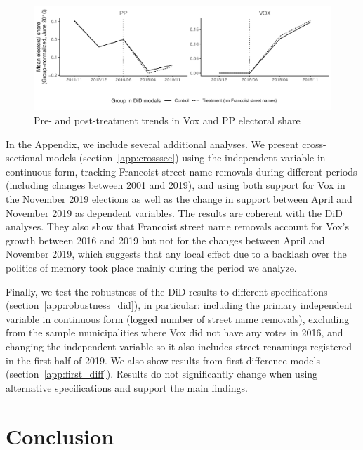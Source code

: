 \documentclass[12pt, titlepage]{article}
\begin{document}
\begin{figure}[htb!]
\centering

  \includegraphics[width = \textwidth]{img/par_trends_norm}

  \caption{Pre- and post-treatment trends in Vox and PP electoral share}\label{fig:par_trends_norm}

\end{figure}

In the Appendix, we include several additional analyses. We present cross-sectional models (section~\ref{app:crosssec}) using the independent variable in continuous form, tracking Francoist street name removals during different periods (including changes between 2001 and 2019), and using both support for Vox in the November 2019 elections as well as the change in support between April and November 2019 as dependent variables.
The results are coherent with the DiD analyses. They also show that Francoist street name removals account for Vox's growth between 2016 and 2019 but not for the changes between April and November 2019, which suggests that any local effect due to a backlash over the politics of memory took place mainly during the period we analyze.

Finally, we test the robustness of the DiD results to different specifications (section~\ref{app:robustness_did}), in particular: including the primary independent variable in continuous form (logged number of street name removals), excluding from the sample municipalities where Vox did not have any votes in 2016, and changing the independent variable so it also includes street renamings registered in the first half of 2019.
We also show results from first-difference models (section~\ref{app:first_diff}).
Results do not significantly change when using alternative specifications and support the main findings.

\section*{Conclusion}
\end{document}
